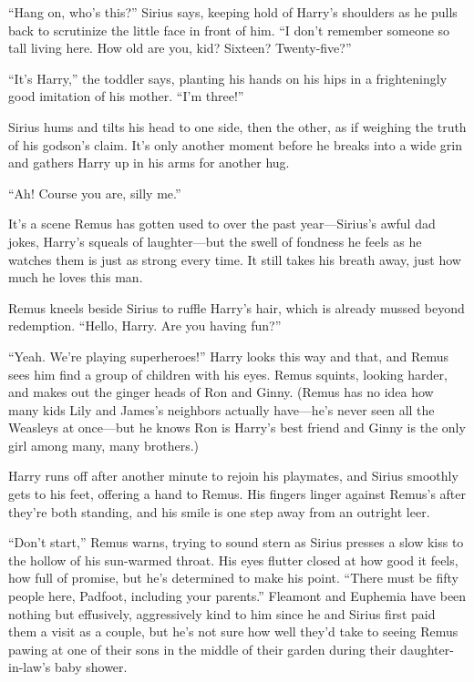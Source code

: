 “Hang on, who’s this?” Sirius says, keeping hold of Harry’s shoulders as he pulls back to scrutinize the little face in front of him. “I don’t remember someone so tall living here. How old are you, kid? Sixteen? Twenty-five?”

“It’s Harry,” the toddler says, planting his hands on his hips in a frighteningly good imitation of his mother. “I’m three!”

Sirius hums and tilts his head to one side, then the other, as if weighing the truth of his godson’s claim. It’s only another moment before he breaks into a wide grin and gathers Harry up in his arms for another hug.

“Ah! Course you are, silly me.”

It’s a scene Remus has gotten used to over the past year—Sirius’s awful dad jokes, Harry’s squeals of laughter—but the swell of fondness he feels as he watches them is just as strong every time. It still takes his breath away, just how much he loves this man.

Remus kneels beside Sirius to ruffle Harry’s hair, which is already mussed beyond redemption. “Hello, Harry. Are you having fun?”

“Yeah. We’re playing superheroes!” Harry looks this way and that, and Remus sees him find a group of children with his eyes. Remus squints, looking harder, and makes out the ginger heads of Ron and Ginny. (Remus has no idea how many kids Lily and James’s neighbors actually have—he’s never seen all the Weasleys at once—but he knows Ron is Harry’s best friend and Ginny is the only girl among many, many brothers.)

Harry runs off after another minute to rejoin his playmates, and Sirius smoothly gets to his feet, offering a hand to Remus. His fingers linger against Remus’s after they’re both standing, and his smile is one step away from an outright leer.

“Don’t start,” Remus warns, trying to sound stern as Sirius presses a slow kiss to the hollow of his sun-warmed throat. His eyes flutter closed at how good it feels, how full of promise, but he’s determined to make his point. “There must be fifty people here, Padfoot, including your parents.” Fleamont and Euphemia have been nothing but effusively, aggressively kind to him since he and Sirius first paid them a visit as a couple, but he’s not sure how well they’d take to seeing Remus pawing at one of their sons in the middle of their garden during their daughter-in-law’s baby shower.

